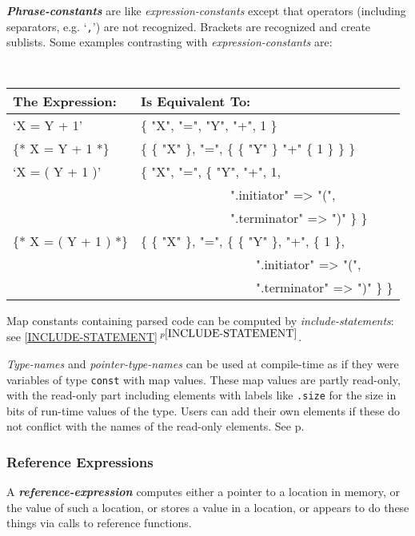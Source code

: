 \documentclass[12pt]{article}
\newcommand{\emkey}[1]{{\em \bfseries #1}}
\newcommand{\itemref}[1]{\ref{#1}$\,^{p\pageref{#1}}$}
\newcommand{\pagref}[1]{p\pageref{#1}}
\begin{document}
\emkey{Phrase-constants}\label{PHRASE-CONSTANT}
are like {\em expression-constants} except that
operators (including separators, e.g. `{\tt ,}') are not recognized.
Brackets are recognized and create sublists.  Some examples contrasting
with {\em expression-constants} are:
\begin{center} \tt
\begin{tabular}{l@{~~~}l}
\rm The Expression:	& \rm Is Equivalent To:
\\\hline
`X = Y + 1'			& \{ "X", "=", "Y", "+", 1 \}
\\[0.5ex]
\{* X = Y + 1 *\}		& \{ \{ "X" \}, "=",
                                     \{ \{ "Y" \} "+" \{ 1 \} \} \}
\\[0.5ex]
`X = ( Y + 1 )'		& \{ "X", "=", \{ "Y", "+", 1, \\
                        & ~~~~~~~~~~~~~~".initiator" => "(", \\
                        & ~~~~~~~~~~~~~~".terminator" => ")" \} \}
\\[0.5ex]
\{* X = ( Y + 1 ) *\}	& \{ \{ "X" \}, "=", \{ \{ "Y" \}, "+", \{ 1 \}, \\
                        & ~~~~~~~~~~~~~~~~~~".initiator" => "(", \\
                        & ~~~~~~~~~~~~~~~~~~".terminator" => ")" \} \}
\end{tabular}
\end{center}

Map constants containing parsed code can be computed
by {\em include-statements}: see \itemref{INCLUDE-STATEMENT}.

{\em Type-names} and {\em pointer-type-names} can be used at
compile-time as if they were variables of type {\tt const}
with map values.  These map values are partly read-only,
with the read-only part including elements with labels like
{\tt .size} for the size in bits of run-time values of the type.
Users can add their own elements if these do not conflict
with the names of the read-only elements.  See \pagref{TYPE-MAPS}.

\subsubsection{Reference Expressions}
\label{REFERENCE-EXPRESSIONS}

A \emkey{reference-expression} computes either a pointer to a location
in memory, or the value of such a location, or stores a value in a location,
or appears to do these things via calls to reference functions.
\end{document}
